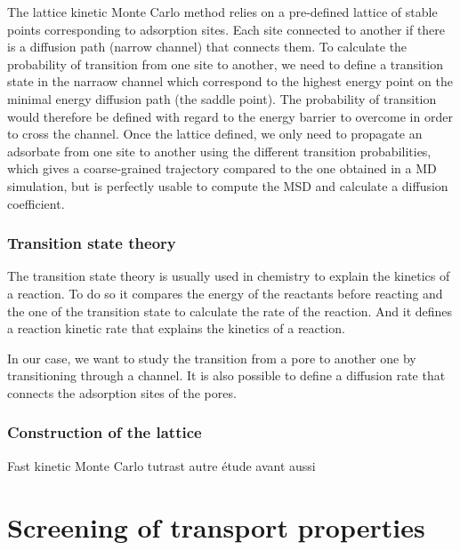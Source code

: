 \documentclass[main]{subfiles}
\begin{document}
The lattice kinetic Monte Carlo method relies on a pre-defined lattice of stable points corresponding to adsorption sites. Each site connected to another if there is a diffusion path (narrow channel) that connects them. To calculate the probability of transition from one site to another, we need to define a transition state in the narraow channel which correspond to the highest energy point on the minimal energy diffusion path (the saddle point). The probability of transition would therefore be defined with regard to the energy barrier to overcome in order to cross the channel. Once the lattice defined, we only need to propagate an adsorbate from one site to another using the different transition probabilities, which gives a coarse-grained trajectory compared to the one obtained in a MD simulation, but is perfectly usable to compute the MSD and calculate a diffusion coefficient.


\subsubsection{Transition state theory}

The transition state theory is usually used in chemistry to explain the kinetics of a reaction. To do so it compares the energy of the reactants before reacting and the one of the transition state to calculate the rate of the reaction. And it defines a reaction kinetic rate that explains the kinetics of a reaction.

In our case, we want to study the transition from a pore to another one by transitioning through a channel. It is also possible to define a diffusion rate that connects the adsorption sites of the pores. 


\subsubsection{Construction of the lattice}


Fast kinetic Monte Carlo
tutrast\autocite{Mace_2019} autre étude avant aussi



\section{Screening of transport properties}\label{sct:md_screening}
\end{document}
